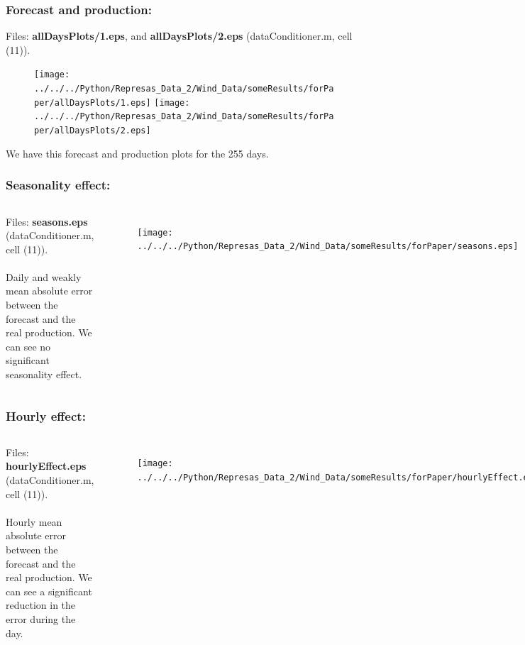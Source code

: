 \documentclass[aspectratio=169]{beamer}\usepackage[utf8]{inputenc}
\begin{document}

\begin{frame}\frametitle{Forecast and production:}
Files: \textbf{allDaysPlots/1.eps}, and \textbf{allDaysPlots/2.eps} (dataConditioner.m, cell (11)).
\begin{figure}[ht!]
\centering
\texttt{[image: ../../../Python/Represas\_Data\_2/Wind\_Data/someResults/forPaper/allDaysPlots/1.eps]}
\texttt{[image: ../../../Python/Represas\_Data\_2/Wind\_Data/someResults/forPaper/allDaysPlots/2.eps]}\end{figure}

We have this forecast and production plots for the 255 days.

\end{frame}


\begin{frame}\frametitle{Seasonality effect:}

\begin{columns}

Files: \textbf{seasons.eps} (dataConditioner.m, cell (11)).\\
\quad\\
Daily and weakly mean absolute error between the forecast and the real production. We can see no significant seasonality effect.

\begin{figure}[ht!]
\centering
\texttt{[image: ../../../Python/Represas\_Data\_2/Wind\_Data/someResults/forPaper/seasons.eps]}
\end{figure}

\end{columns}

\end{frame}


\begin{frame}\frametitle{Hourly effect:}

\begin{columns}

Files: \textbf{hourlyEffect.eps} (dataConditioner.m, cell (11)).\\
\quad\\
Hourly mean absolute error between the forecast and the real production. We can see a significant reduction in the error during the day.

\begin{figure}[ht!]
\centering
\texttt{[image: ../../../Python/Represas\_Data\_2/Wind\_Data/someResults/forPaper/hourlyEffect.eps]}
\end{figure}

\end{columns}

\end{frame}
\end{document}
